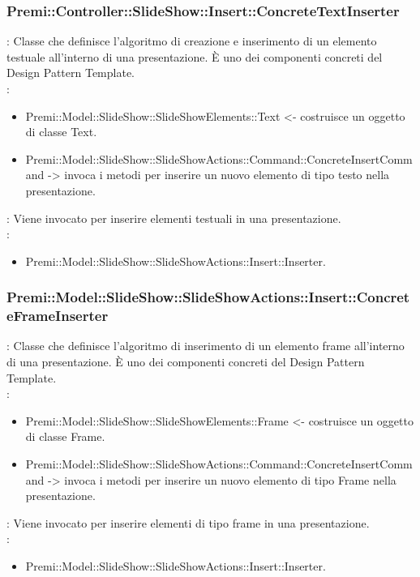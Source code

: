 {	\subsubsection{Premi::Controller::SlideShow::Insert::ConcreteTextInserter}{
				\textbf{\tipo}: Classe che definisce l'algoritmo di creazione e inserimento di un elemento testuale all’interno di una presentazione. È uno dei componenti concreti del Design Pattern Template.\\	
				\textbf{\relaz}: 
				\begin{itemize}
					\item Premi::Model::SlideShow::SlideShowElements::Text <- costruisce un oggetto di classe Text.
					\item Premi::Model::SlideShow::SlideShowActions::Command::ConcreteInsertCommand -> invoca i metodi per inserire un nuovo elemento di tipo testo nella presentazione.
				\end{itemize} 
				\textbf{\interfacce}: Viene invocato per inserire elementi testuali in una presentazione.\\
                \textbf{\base}: 
                    \begin{itemize}
                    \item Premi::Model::SlideShow::SlideShowActions::Insert::Inserter.
                    \end{itemize}
			}
    \subsubsection{Premi::Model::SlideShow::SlideShowActions::Insert::ConcreteFrameInserter}{
				\textbf{\tipo}: Classe che definisce l'algoritmo di inserimento di un elemento frame all’interno di una presentazione.
È uno dei componenti concreti del Design Pattern Template.\\	
				\textbf{\relaz}: 
				\begin{itemize}
				\item Premi::Model::SlideShow::SlideShowElements::Frame <- costruisce un oggetto di classe Frame.
				\item Premi::Model::SlideShow::SlideShowActions::Command::ConcreteInsertCommand -> invoca i metodi per inserire un nuovo elemento di tipo Frame nella presentazione.
				\end{itemize} 
				\textbf{\interfacce}: Viene invocato per inserire elementi di tipo frame in una presentazione.\\
                \textbf{\base}: 
                    \begin{itemize}
                    \item Premi::Model::SlideShow::SlideShowActions::Insert::Inserter.
                    \end{itemize}
			}
}
